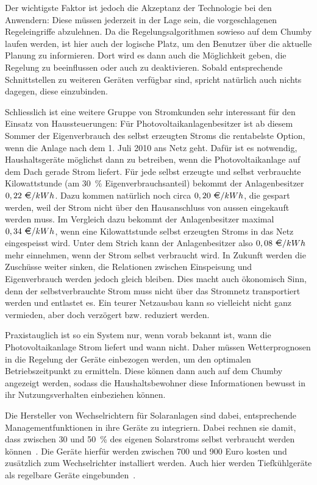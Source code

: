 \documentclass[12pt,BCOR=8.5mm]{scrartcl}
\newcommand*\euro{\textup{\EUR}}
\begin{document}
Der wichtigste Faktor ist jedoch die Akzeptanz der Technologie bei den
Anwendern: Diese müssen jederzeit in der Lage sein, die vorgeschlagenen
Regeleingriffe abzulehnen. Da die Regelungsalgorithmen sowieso auf dem
Chumby laufen werden, ist hier auch der logische Platz, um den Benutzer
über die aktuelle Planung zu informieren. Dort wird es dann auch die
Möglichkeit geben, die Regelung zu beeinflussen oder auch zu
deaktivieren. Sobald entsprechende Schnittstellen zu weiteren Geräten
verfügbar sind, spricht natürlich auch nichts dagegen, diese
einzubinden.

Schliesslich ist eine weitere Gruppe von Stromkunden sehr interessant
für den Einsatz von Haussteuerungen: Für Photovoltaikanlagenbesitzer ist
ab diesem Sommer der Eigenverbrauch des selbst erzeugten Stroms die
rentabelste Option, wenn die Anlage nach dem 1. Juli 2010 ans Netz geht.
Dafür ist es notwendig, Haushaltsgeräte möglichst dann zu betreiben,
wenn die Photovoltaikanlage auf dem Dach gerade Strom liefert. Für jede
selbst erzeugte und selbst verbrauchte Kilowattstunde (am 30~\%
Eigenverbrauchsanteil) bekommt der Anlagenbesitzer $0,22~{\euro}/{kWh}$.  Dazu
kommen natürlich noch circa $0,20~{\euro}/{kWh}$, die gespart werden, weil der
Strom nicht über den Hausanschluss von aussen eingekauft werden muss. Im
Vergleich dazu bekommt der Anlagenbesitzer maximal $0,34~{\euro}/{kWh}$, wenn
eine Kilowattstunde selbst erzeugten Stroms in das Netz eingespeisst
wird.  Unter dem Strich kann der Anlagenbesitzer also $0,08
~{\euro}/{kWh}$ mehr
einnehmen, wenn der Strom selbst verbraucht wird. In Zukunft werden die
Zuschüsse weiter sinken, die Relationen zwischen Einspeisung und
Eigenverbrauch werden jedoch gleich bleiben. Dies macht auch ökonomisch
Sinn, denn der selbstverbrauchte Strom muss nicht über das Stromnetz
transportiert werden und entlastet es. Ein teurer Netzausbau kann so
vielleicht nicht ganz vermieden, aber doch verzögert bzw.  reduziert
werden.

Praxistauglich ist so ein System nur, wenn vorab bekannt ist, wann die
Photovoltaikanlage Strom liefert und wann nicht. Daher müssen
Wetterprognosen in die Regelung der Geräte einbezogen werden, um den
optimalen Betriebszeitpunkt zu ermitteln. Diese können dann auch auf dem
Chumby angezeigt werden, sodass die Haushaltsbewohner diese
Informationen bewusst in ihr Nutzungsverhalten einbeziehen können.

Die Hersteller von Wechselrichtern für Solaranlagen sind dabei,
entsprechende Managementfunktionen in ihre Geräte zu integriern. Dabei
rechnen sie damit, dass zwischen 30 und 50~\% des eigenen Solarstroms
selbst verbraucht werden können~\cite{ossenbrinck10herstellung}. Die
Geräte hierfür werden zwischen 700 und 900 Euro kosten und zusätzlich
zum Wechselrichter installiert werden. Auch hier werden Tiefkühlgeräte
als regelbare Geräte eingebunden~\cite{ossenbrinck10herstellung}.
\end{document}
